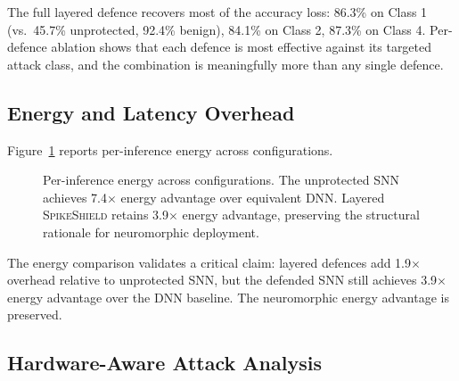 \documentclass[sigconf,nonacm]{acmart}
\begin{document}
The full layered defence recovers most of the accuracy loss:
86.3\% on Class 1 (vs.\ 45.7\% unprotected, 92.4\% benign), 84.1\%
on Class 2, 87.3\% on Class 4. Per-defence ablation shows that
each defence is most effective against its targeted attack class,
and the combination is meaningfully more than any single defence.

\subsection{Energy and Latency Overhead}

Figure~\ref{fig:energy} reports per-inference energy across
configurations.

\begin{figure}[h]
\centering
{}
\caption{Per-inference energy across configurations. The unprotected
  SNN achieves 7.4$\times$ energy advantage over equivalent DNN.
  Layered \textsc{SpikeShield} retains 3.9$\times$ energy advantage,
  preserving the structural rationale for neuromorphic deployment.}
\label{fig:energy}
\end{figure}

The energy comparison validates a critical claim: layered defences
add 1.9$\times$ overhead relative to unprotected SNN, but the
defended SNN still achieves 3.9$\times$ energy advantage over the
DNN baseline. The neuromorphic energy advantage is preserved.

\subsection{Hardware-Aware Attack Analysis}
\end{document}
